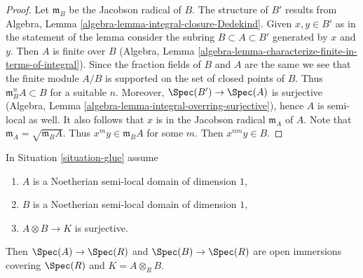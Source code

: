 \begin{proof}
Let $\mathfrak m_B$ be the Jacobson radical of $B$.
The structure of $B'$ results from
Algebra, Lemma \ref{algebra-lemma-integral-closure-Dedekind}.
Given $x, y \in B'$ as in the statement of the lemma consider
the subring $B \subset A \subset B'$ generated by $x$ and $y$.
Then $A$ is finite over $B$ (Algebra, Lemma
\ref{algebra-lemma-characterize-finite-in-terms-of-integral}).
Since the fraction fields of $B$ and $A$ are the same we see
that the finite module $A/B$ is supported on the set of
closed points of $B$. Thus $\mathfrak m_B^n A \subset B$ for
a suitable $n$. Moreover, $\Spec(B') \to \Spec(A)$ is
surjective (Algebra, Lemma \ref{algebra-lemma-integral-overring-surjective}),
hence $A$ is semi-local as well. It also follows that
$x$ is in the Jacobson radical $\mathfrak m_A$ of $A$. Note that
$\mathfrak m_A = \sqrt{\mathfrak m_B A}$.
Thus $x^m y \in \mathfrak m_B A$ for some $m$.
Then $x^{nm} y \in B$.
\end{proof}

\begin{lemma}
\label{lemma-semi-local-both-side}
In Situation \ref{situation-glue} assume
\begin{enumerate}
\item $A$ is a Noetherian semi-local domain of dimension $1$,
\item $B$ is a Noetherian semi-local domain of dimension $1$,
\item $A \otimes B \to K$ is surjective.
\end{enumerate}
Then $\Spec(A) \to \Spec(R)$ and $\Spec(B) \to \Spec(R)$
are open immersions covering $\Spec(R)$ and $K = A \otimes_R B$.
\end{lemma}

